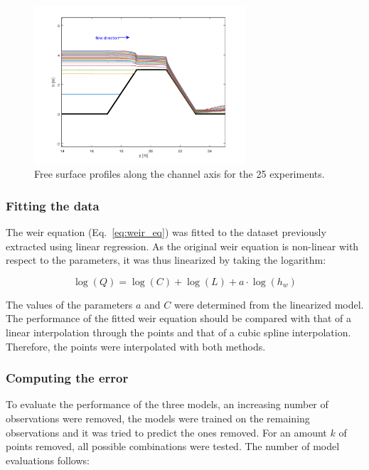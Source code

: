 \begin{figure}[h]
  \centering
  \includegraphics[width=0.7\textwidth]{Figures/free_surfaces.png}
  \caption{Free surface profiles along the channel axis for the \num{25} experiments.}
  \label{fig:free_surfaces}
\end{figure}


\subsubsection{Fitting the data}
The weir equation (Eq.~\ref{eq:weir_eq}) was fitted to the dataset previously extracted using linear regression.
As the original weir equation is non-linear with respect to the parameters, it was thus linearized by taking the logarithm:

\begin{equation}
  \log(Q) = \log(C) + \log(L) + a \cdot \log(h_w)
\end{equation}

\noindent The values of the parameters $a$ and $C$ were determined from the linearized model.
The performance of the fitted weir equation should be compared with that of a linear interpolation through the points and that of a cubic spline interpolation.
Therefore, the points were interpolated with both methods.


\subsubsection{Computing the error}\label{sec:compute_error}
To evaluate the performance of the three models, an increasing number of observations were removed, the models were trained on the remaining observations and it was tried to predict the ones removed.
For an amount $k$ of points removed, all possible combinations were tested. The number of model evaluations follows:

